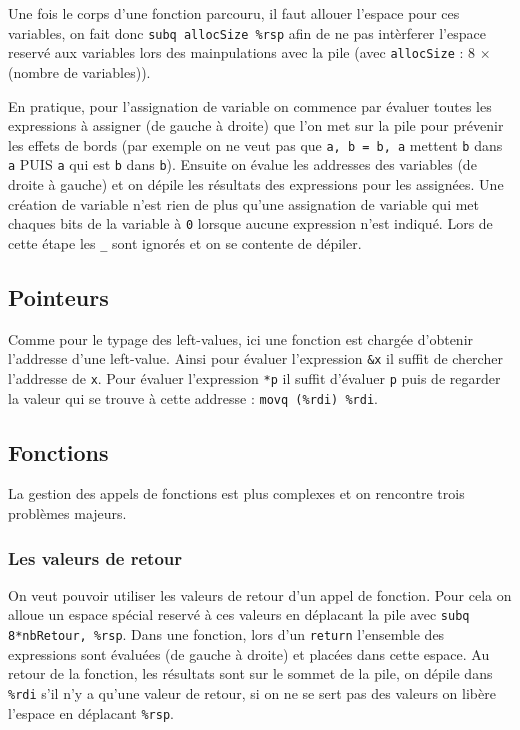 \documentclass[9pt,a4paper]{article}
\begin{document}
Une fois le corps d'une fonction parcouru, il faut allouer l'espace pour ces variables, on fait donc \verb|subq allocSize %rsp| afin de ne pas intèrferer l'espace reservé aux variables lors des mainpulations avec la pile (avec \verb|allocSize| : 8 $\times$ (nombre de variables)). 

En pratique, pour l'assignation de variable on commence par évaluer toutes les expressions à assigner (de gauche à droite) que l'on met sur la pile pour prévenir les effets de bords (par exemple on ne veut pas que \verb|a, b = b, a| mettent \verb|b| dans \verb|a| PUIS \verb|a| qui est \verb|b| dans \verb|b|). Ensuite on évalue les addresses des variables (de droite à gauche) et on dépile les résultats des expressions pour les assignées. Une création de variable n'est rien de plus qu'une assignation de variable qui met chaques bits de la variable à \verb|0| lorsque aucune expression n'est indiqué.
Lors de cette étape les \verb|_| sont ignorés et on se contente de dépiler.

\subsection{Pointeurs}

Comme pour le typage des left-values, ici une fonction est chargée d'obtenir l'addresse d'une left-value. Ainsi pour évaluer l'expression \verb|&x| il suffit de chercher l'addresse de \verb|x|. Pour évaluer l'expression \verb|*p| il suffit d'évaluer \verb|p| puis de regarder la valeur qui se trouve à cette addresse : \verb|movq (%rdi) %rdi|.

\subsection{Fonctions}

La gestion des appels de fonctions est plus complexes et on rencontre trois problèmes majeurs.

\subsubsection*{Les valeurs de retour}

On veut pouvoir utiliser les valeurs de retour d'un appel de fonction. Pour cela on alloue un espace spécial reservé à ces valeurs en déplacant la pile avec \verb|subq 8*nbRetour, %rsp|. Dans une fonction, lors d'un \verb|return| l'ensemble des expressions sont évaluées (de gauche à droite) et placées dans cette espace. Au retour de la fonction, les résultats sont sur le sommet de la pile, on dépile dans \verb|%rdi| s'il n'y a qu'une valeur de retour, si on ne se sert pas des valeurs on libère l'espace en déplacant \verb|%rsp|.
\end{document}
